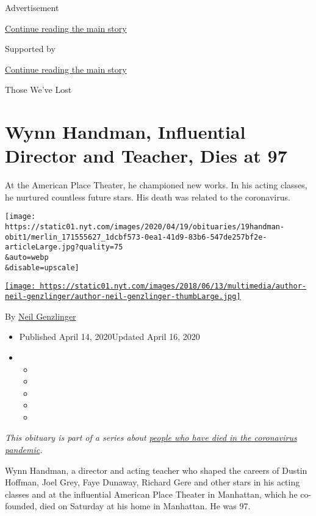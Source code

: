 Advertisement

\protect\hyperlink{after-top}{Continue reading the main story}

Supported by

\protect\hyperlink{after-sponsor}{Continue reading the main story}

Those We've Lost

\hypertarget{wynn-handman-influential-director-and-teacher-dies-at-97}{%
\section{Wynn Handman, Influential Director and Teacher, Dies at
97}\label{wynn-handman-influential-director-and-teacher-dies-at-97}}

At the American Place Theater, he championed new works. In his acting
classes, he nurtured countless future stars. His death was related to
the coronavirus.

\texttt{[image: https://static01.nyt.com/images/2020/04/19/obituaries/19handman-obit1/merlin\_171555627\_1dcbf573-0ea1-41d9-83b6-547de257bf2e-articleLarge.jpg?quality=75\\\&auto=webp\\\&disable=upscale]}

\href{https://www.nytimes.com/by/neil-genzlinger}{\texttt{[image: https://static01.nyt.com/images/2018/06/13/multimedia/author-neil-genzlinger/author-neil-genzlinger-thumbLarge.jpg]}}

By \href{https://www.nytimes.com/by/neil-genzlinger}{Neil Genzlinger}

\begin{itemize}
\item
  Published April 14, 2020Updated April 16, 2020
\item
  \begin{itemize}
  \item
  \item
  \item
  \item
  \item
  \end{itemize}
\end{itemize}

\emph{This obituary is part of a series about}
\href{https://www.nytimes.com/series/people-who-have-died-of-the-coronavirus}{\emph{people
who have died in the coronavirus pandemic}}\emph{.}

Wynn Handman, a director and acting teacher who shaped the careers of
Dustin Hoffman, Joel Grey, Faye Dunaway, Richard Gere and other stars in
his acting classes and at the influential American Place Theater in
Manhattan, which he co-founded, died on Saturday at his home in
Manhattan. He was 97.

